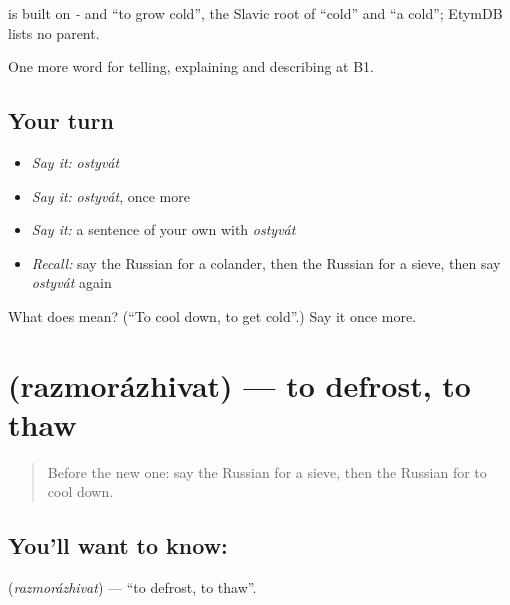 \begin{cousinweb}
\emph{} is built on \emph{-} and \emph{} \textquotedblleft{}to grow cold\textquotedblright{}, the Slavic root of \emph{} \textquotedblleft{}cold\textquotedblright{} and \emph{} \textquotedblleft{}a cold\textquotedblright{}; EtymDB lists no parent.
\end{cousinweb}

\begin{grammarlens}[title={What you've built}]
One more word for telling, explaining and describing at B1.
\end{grammarlens}

\subsection*{Your turn}
\begin{itemize}
\raggedright
  \item \emph{Say it:} \emph{ostyvát}
  \item \emph{Say it:} \emph{ostyvát}, once more
  \item \emph{Say it:} a sentence of your own with \emph{ostyvát}
  \item \emph{Recall:} say the Russian for a colander, then the Russian for a sieve, then say \emph{ostyvát} again
\end{itemize}

\begin{tcolorbox}[breakable,colback=teal!4,colframe=teal!35!black,title={Before you move on}]
What does  mean? (\textquotedblleft{}To cool down, to get cold\textquotedblright{}.) Say it once more.
\end{tcolorbox}
\section[\texorpdfstring{\ru{размораживать} (razmorázhivat)}{размораживать (razmorázhivat)}]{ (razmorázhivat) — to defrost, to thaw}

\label{lesson:RU-C335-razmorazhivat}



\begin{quote}
Before the new one: say the Russian for a sieve, then the Russian for to cool down.
\end{quote}

\subsection*{You'll want to know: }
\textbf{} (\emph{razmorázhivat}) — \textquotedblleft{}to defrost, to thaw\textquotedblright{}.

